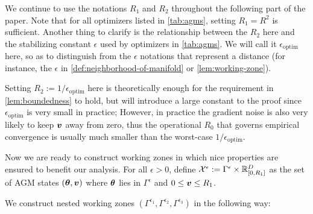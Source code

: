 We continue to use the notations $R_1$ and $R_2$ throughout the following part of the paper. Note that for all optimizers listed in \cref{tab:agms}, setting $R_1 = R^2$ is sufficient. Another thing to clarify is the relationship between the $R_2$ here and the stabilizing constant $\epsilon$ used by optimizers in \cref{tab:agms}. We will call it $\epsilon_{\mathrm{optim}}$ here, so as to distinguish from the $\epsilon$ notations that represent a distance (for instance, the $\epsilon$ in \cref{def:neighborhood-of-manifold} or \cref{lem:working-zone}).

\begin{remark}
Setting $R_2 := 1/\epsilon_{\mathrm{optim}}$ here is theoretically enough for the requirement in \cref{lem:boundedness} to hold, but will introduce a large constant to the proof since $\epsilon_{\mathrm{optim}}$ is very small in practice; However, in practice the gradient noise is also very likely to keep ${\bm{v}}$ away from zero, thus the operational $R_0$ that governs empirical convergence is usually much smaller than the worst-case $1/\epsilon_{\mathrm{optim}}$.    
\end{remark}



Now we are ready to construct working zones in which nice properties are ensured to benefit our analysis. For all $\epsilon > 0$, define $\mathcal{X}^{\epsilon} := \Gamma^{\epsilon} \times \mathbb{R}_{[0,R_1]}^{D}$ as the set of AGM states $({\bm{\theta}}, {\bm{v}})$ where ${\bm{\theta}}$ lies in $\Gamma^{\epsilon}$ and $0 \leq {\bm{v}} \leq R_1$.


We construct nested working zones $(\Gamma^{\epsilon_1}, \Gamma^{\epsilon_2},\Gamma^{\epsilon_3})$ in the following way:



